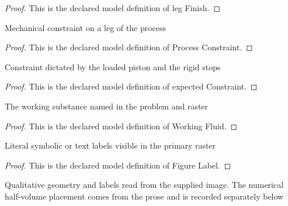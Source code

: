 \begin{proof}
  This is the declared model definition of leg Finish.
\end{proof}
\begin{definition}
  \label{def:physics:phyx-mini-0454:phyxminiproblems-problemphyxmini0454-processconstraint}
  Mechanical constraint on a leg of the process
\end{definition}
\begin{proof}
  This is the declared model definition of Process Constraint.
\end{proof}
\begin{definition}
  \label{def:physics:phyx-mini-0454:phyxminiproblems-problemphyxmini0454-expectedconstraint}
  Constraint dictated by the loaded piston and the rigid stops
\end{definition}
\begin{proof}
  This is the declared model definition of expected Constraint.
\end{proof}
\begin{definition}
  \label{def:physics:phyx-mini-0454:phyxminiproblems-problemphyxmini0454-workingfluid}
  The working substance named in the problem and raster
\end{definition}
\begin{proof}
  This is the declared model definition of Working Fluid.
\end{proof}
\begin{definition}
  \label{def:physics:phyx-mini-0454:phyxminiproblems-problemphyxmini0454-figurelabel}
  Literal symbolic or text labels visible in the primary raster
\end{definition}
\begin{proof}
  This is the declared model definition of Figure Label.
\end{proof}
\begin{definition}
  \label{def:physics:phyx-mini-0454:phyxminiproblems-problemphyxmini0454-pistoncylinderfigure}
  Qualitative geometry and labels read from the supplied image. The numerical half-volume placement comes from the prose and is recorded separately below
\end{definition}
